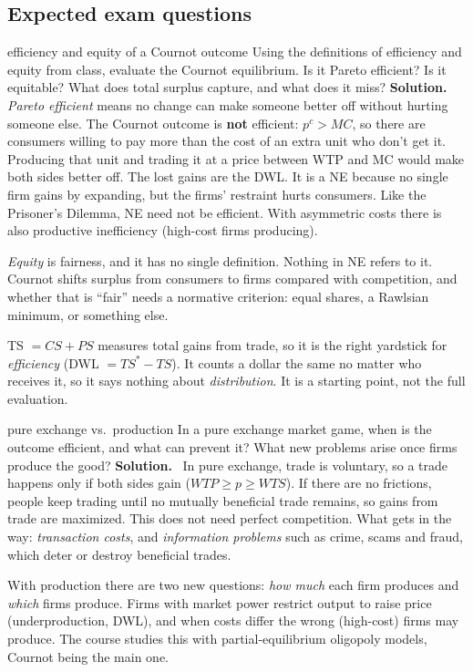 \documentclass[11pt]{article}
\newcommand{\soln}{\tcblower\textbf{Solution.}\ }
\begin{document}
\subsection*{Expected exam questions}
\begin{examq}{efficiency and equity of a Cournot outcome}
Using the definitions of efficiency and equity from class, evaluate the Cournot equilibrium. Is it Pareto efficient? Is it equitable? What does total surplus capture, and what does it miss?
\soln
\emph{Pareto efficient} means no change can make someone better off without hurting someone else. The Cournot outcome is \textbf{not} efficient: $p^c>MC$, so there are consumers willing to pay more than the cost of an extra unit who don't get it. Producing that unit and trading it at a price between WTP and MC would make both sides better off. The lost gains are the DWL. It is a NE because no single firm gains by expanding, but the firms' restraint hurts consumers. Like the Prisoner's Dilemma, NE need not be efficient. With asymmetric costs there is also productive inefficiency (high-cost firms producing).

\emph{Equity} is fairness, and it has no single definition. Nothing in NE refers to it. Cournot shifts surplus from consumers to firms compared with competition, and whether that is ``fair'' needs a normative criterion: equal shares, a Rawlsian minimum, or something else.

TS $=CS+PS$ measures total gains from trade, so it is the right yardstick for \emph{efficiency} (DWL $=TS^*-TS$). It counts a dollar the same no matter who receives it, so it says nothing about \emph{distribution}. It is a starting point, not the full evaluation.
\end{examq}

\begin{examq}{pure exchange vs.\ production}
In a pure exchange market game, when is the outcome efficient, and what can prevent it? What new problems arise once firms produce the good?
\soln
In pure exchange, trade is voluntary, so a trade happens only if both sides gain ($WTP\ge p\ge WTS$). If there are no frictions, people keep trading until no mutually beneficial trade remains, so gains from trade are maximized. This does not need perfect competition. What gets in the way: \emph{transaction costs}, and \emph{information problems} such as crime, scams and fraud, which deter or destroy beneficial trades.

With production there are two new questions: \emph{how much} each firm produces and \emph{which} firms produce. Firms with market power restrict output to raise price (underproduction, DWL), and when costs differ the wrong (high-cost) firms may produce. The course studies this with partial-equilibrium oligopoly models, Cournot being the main one.
\end{examq}
\end{document}
